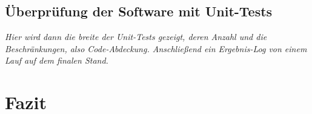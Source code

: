 \subsection{Überprüfung der Software mit Unit-Tests}
\label{subsec:unittests}

\emph{Hier wird dann die breite der Unit-Tests gezeigt, deren Anzahl und die Beschränkungen, also Code-Abdeckung. Anschließend ein Ergebnis-Log von einem Lauf auf dem finalen Stand.}


\section{Fazit}
\label{sec:Fazit}